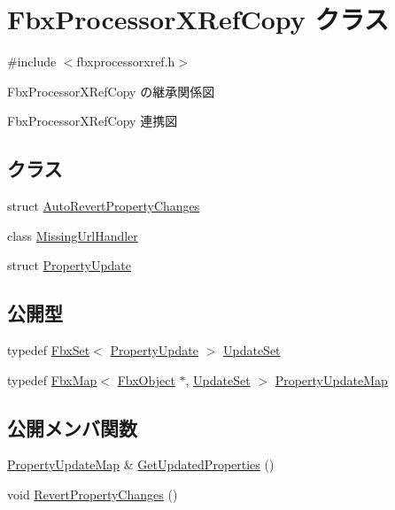 \hypertarget{class_fbx_processor_x_ref_copy}{}\section{Fbx\+Processor\+X\+Ref\+Copy クラス}
\label{class_fbx_processor_x_ref_copy}


{\ttfamily \#include $<$fbxprocessorxref.\+h$>$}



Fbx\+Processor\+X\+Ref\+Copy の継承関係図


Fbx\+Processor\+X\+Ref\+Copy 連携図
\subsection*{クラス}
\begin{DoxyCompactItemize}
\item 
struct \hyperlink{struct_fbx_processor_x_ref_copy_1_1_auto_revert_property_changes}{Auto\+Revert\+Property\+Changes}
\item 
class \hyperlink{class_fbx_processor_x_ref_copy_1_1_missing_url_handler}{Missing\+Url\+Handler}
\item 
struct \hyperlink{struct_fbx_processor_x_ref_copy_1_1_property_update}{Property\+Update}
\end{DoxyCompactItemize}
\subsection*{公開型}
\begin{DoxyCompactItemize}
\item 
typedef \hyperlink{class_fbx_set}{Fbx\+Set}$<$ \hyperlink{struct_fbx_processor_x_ref_copy_1_1_property_update}{Property\+Update} $>$ \hyperlink{class_fbx_processor_x_ref_copy_aa745209208dc5e21926fa7d4dde84afb}{Update\+Set}
\item 
typedef \hyperlink{class_fbx_map}{Fbx\+Map}$<$ \hyperlink{class_fbx_object}{Fbx\+Object} $\ast$, \hyperlink{class_fbx_processor_x_ref_copy_aa745209208dc5e21926fa7d4dde84afb}{Update\+Set} $>$ \hyperlink{class_fbx_processor_x_ref_copy_af0408f51b60aa6c9fb8aab6e73f57eb7}{Property\+Update\+Map}
\end{DoxyCompactItemize}
\subsection*{公開メンバ関数}
\begin{DoxyCompactItemize}
\item 
\hyperlink{class_fbx_processor_x_ref_copy_af0408f51b60aa6c9fb8aab6e73f57eb7}{Property\+Update\+Map} \& \hyperlink{class_fbx_processor_x_ref_copy_a71fbf7f8e597830ae72f1427894484c4}{Get\+Updated\+Properties} ()
\item 
void \hyperlink{class_fbx_processor_x_ref_copy_acb594ac9c10bdc9cf32efb2a64840654}{Revert\+Property\+Changes} ()
\end{DoxyCompactItemize}
